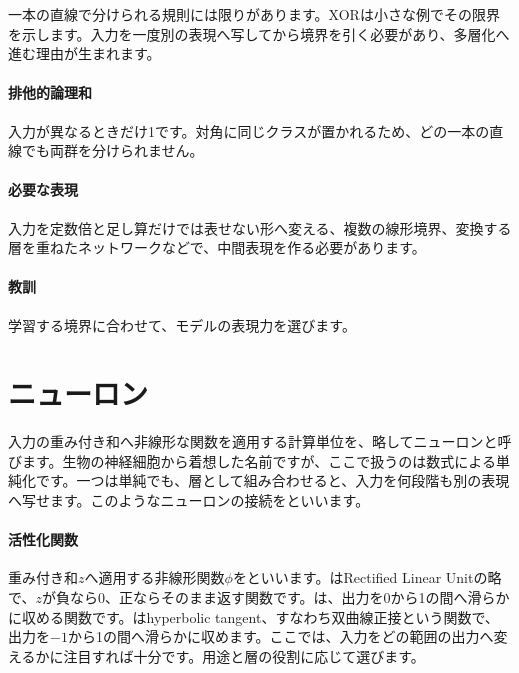 一本の直線で分けられる規則には限りがあります。XORは小さな例でその限界を示します。入力を一度別の表現へ写してから境界を引く必要があり、多層化へ進む理由が生まれます。

\begingroup
\begingroup
      \centering
\par
\endgroup
\medskip
\begingroup
\paragraph{排他的論理和}
        入力が異なるときだけ1です。対角に同じクラスが置かれるため、どの一本の直線でも両群を分けられません。

\paragraph{必要な表現}
        入力を定数倍と足し算だけでは表せない形へ変える、複数の線形境界、変換する層を重ねたネットワークなどで、中間表現を作る必要があります。

\paragraph{教訓}
        学習する境界に合わせて、モデルの表現力を選びます。

\par
\endgroup
\par
\endgroup


\section{ニューロン}
\label{sec:06-machine-learning-17}

入力の重み付き和へ非線形な関数を適用する計算単位を、略してニューロンと呼びます。生物の神経細胞から着想した名前ですが、ここで扱うのは数式による単純化です。一つは単純でも、層として組み合わせると、入力を何段階も別の表現へ写せます。このようなニューロンの接続をといいます。

\begingroup
\begingroup
      \centering
      \vspace{5mm}
\paragraph{活性化関数}
        重み付き和$z$へ適用する非線形関数$\phi$をといいます。はRectified Linear Unitの略で、$z$が負なら0、正ならそのまま返す関数です。は、出力を0から1の間へ滑らかに収める関数です。はhyperbolic tangent、すなわち双曲線正接という関数で、出力を$-1$から1の間へ滑らかに収めます。ここでは、入力をどの範囲の出力へ変えるかに注目すれば十分です。用途と層の役割に応じて選びます。

